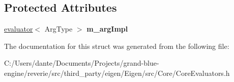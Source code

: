 \subsection*{Protected Attributes}
\begin{DoxyCompactItemize}
\item 
\mbox{\label{struct_eigen_1_1internal_1_1unary__evaluator_3_01_transpose_3_01_arg_type_01_4_00_01_index_based_01_4_a55c2bd8d5d6c3a5739fc4e233e805b81}} 
\mbox{\hyperlink{struct_eigen_1_1internal_1_1evaluator}{evaluator}}$<$ Arg\+Type $>$ {\bfseries m\+\_\+arg\+Impl}
\end{DoxyCompactItemize}


The documentation for this struct was generated from the following file\+:\begin{DoxyCompactItemize}
\item 
C\+:/\+Users/dante/\+Documents/\+Projects/grand-\/blue-\/engine/reverie/src/third\+\_\+party/eigen/\+Eigen/src/\+Core/Core\+Evaluators.\+h\end{DoxyCompactItemize}
